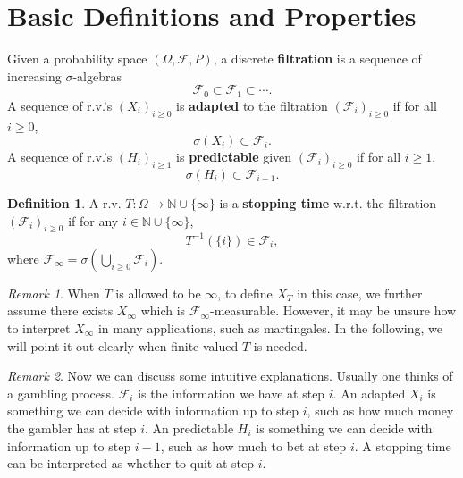 \documentclass[openany]{book}
\theoremstyle{definition}
\newtheorem{definition}{Definition}[chapter]
\theoremstyle{remark}
\newtheorem*{remark}{Remark}
\begin{document}
\section{Basic Definitions and Properties}
Given a probability space $(\Omega,\mathcal{F},P)$, a discrete \textbf{filtration} is a sequence of increasing $\sigma$-algebras
\begin{equation*}
    \mathcal{F}_0\subset \mathcal{F}_1\subset\cdots.
\end{equation*}
A sequence of r.v.'s $(X_i)_{i\ge0}$ is \textbf{adapted} to the filtration $(\mathcal{F}_i)_{i\ge0}$ if for all $i\ge0$,
\begin{equation*}
    \sigma(X_i)\subset \mathcal{F}_i.
\end{equation*}
A sequence of r.v.'s $(H_i)_{i\ge1}$ is \textbf{predictable} given $(\mathcal{F}_i)_{i\ge0}$ if for all $i\ge1$,
\begin{equation*}
    \sigma(H_i)\subset \mathcal{F}_{i-1}.
\end{equation*}
\begin{definition}
    A r.v. $T:\Omega\to \mathbb{N}\cup\{\infty\}$ is a \textbf{stopping time} w.r.t. the filtration $(\mathcal{F}_i)_{i\ge0}$ if for any $i\in \mathbb{N}\cup\{\infty\}$,
    \begin{equation*}
        T^{-1}\left(\{i\}\right)\in \mathcal{F}_i,
    \end{equation*}
    where $\mathcal{F}_{\infty}=\sigma\left(\bigcup_{i\ge0}\mathcal{F}_i\right)$.
\end{definition}
\begin{remark}
    When $T$ is allowed to be $\infty$, to define $X_T$ in this case, we further assume there exists $X_{\infty}$ which is $\mathcal{F}_{\infty}$-measurable. However, it may be unsure how to interpret $X_{\infty}$ in many applications, such as martingales. In the following, we will point it out clearly when finite-valued $T$ is needed.
\end{remark}
\begin{remark}
    Now we can discuss some intuitive explanations. Usually one thinks of a gambling process. $\mathcal{F}_i$ is the information we have at step $i$. An adapted $X_i$ is something we can decide with information up to step $i$, such as how much money the gambler has at step $i$. An predictable $H_i$ is something we can decide with information up to step $i-1$, such as how much to bet at step $i$. A stopping time can be interpreted as whether to quit at step $i$.
\end{remark}
\end{document}
